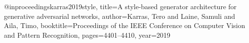 @inproceedings{karras2019style,
  title={A style-based generator architecture for generative adversarial networks},
  author={Karras, Tero and Laine, Samuli and Aila, Timo},
  booktitle={Proceedings of the IEEE Conference on Computer Vision and Pattern Recognition},
  pages={4401--4410},
  year={2019}
}